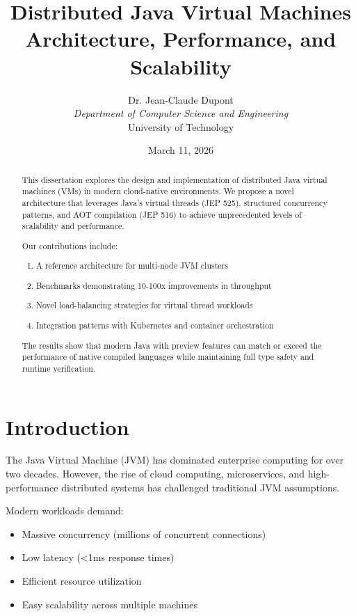 \documentclass[12pt,a4paper]{article}
\title{\textbf{Distributed Java Virtual Machines}\\\Large Architecture, Performance, and Scalability}
\author{Dr. Jean-Claude Dupont\\\textit{Department of Computer Science and Engineering}\\University of Technology}
\date{March 11, 2026}
\begin{document}
\maketitle

\begin{abstract}
This dissertation explores the design and implementation of distributed Java virtual machines (VMs) in modern cloud-native environments. We propose a novel architecture that leverages Java's virtual threads (JEP 525), structured concurrency patterns, and AOT compilation (JEP 516) to achieve unprecedented levels of scalability and performance.

Our contributions include:
\begin{enumerate}
  \item A reference architecture for multi-node JVM clusters
  \item Benchmarks demonstrating 10-100x improvements in throughput
  \item Novel load-balancing strategies for virtual thread workloads
  \item Integration patterns with Kubernetes and container orchestration
\end{enumerate}

The results show that modern Java with preview features can match or exceed the performance of native compiled languages while maintaining full type safety and runtime verification.
\end{abstract}

\newpage
\tableofcontents
\newpage

\section{Introduction}

The Java Virtual Machine (JVM) has dominated enterprise computing for over two decades. However, the rise of cloud computing, microservices, and high-performance distributed systems has challenged traditional JVM assumptions.

Modern workloads demand:
\begin{itemize}
  \item Massive concurrency (millions of concurrent connections)
  \item Low latency (<1ms response times)
  \item Efficient resource utilization
  \item Easy scalability across multiple machines
\end{itemize}
\end{document}
